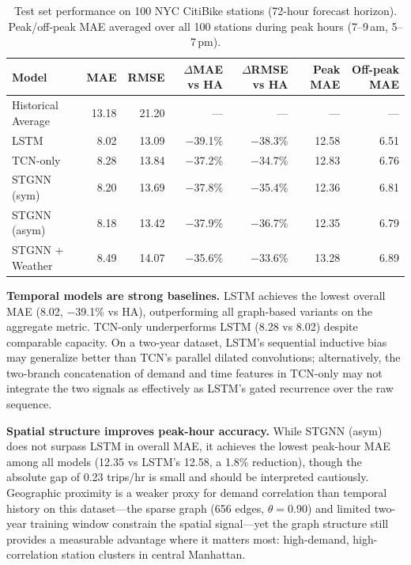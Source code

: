 \documentclass[12pt]{article}
\begin{document}
\begin{table}[h]
\centering
\small
\caption{Test set performance on 100 NYC CitiBike stations (72-hour forecast horizon).
Peak/off-peak MAE averaged over all 100 stations during peak hours (7--9\,am, 5--7\,pm).}
\label{tab:results}
\begin{tabular}{lrrrrrr}
\toprule
Model            & MAE   & RMSE  & $\Delta$MAE vs HA & $\Delta$RMSE vs HA & Peak MAE & Off-peak MAE \\
\midrule
Historical Average  & 13.18 & 21.20 & ---        & ---        & ---   & ---  \\
LSTM                &  8.02 & 13.09 & $-$39.1\%  & $-$38.3\%  & 12.58 & 6.51 \\
TCN-only            &  8.28 & 13.84 & $-$37.2\%  & $-$34.7\%  & 12.83 & 6.76 \\
STGNN (sym)         &  8.20 & 13.69 & $-$37.8\%  & $-$35.4\%  & 12.36 & 6.81 \\
STGNN (asym)        &  8.18 & 13.42 & $-$37.9\%  & $-$36.7\%  & 12.35 & 6.79 \\
STGNN + Weather     &  8.49 & 14.07 & $-$35.6\%  & $-$33.6\%  & 13.28 & 6.89 \\
\bottomrule
\end{tabular}
\end{table}

\textbf{Temporal models are strong baselines.}
LSTM achieves the lowest overall MAE (8.02, $-$39.1\% vs HA), outperforming all
graph-based variants on the aggregate metric.
TCN-only underperforms LSTM (8.28 vs 8.02) despite comparable capacity.
On a two-year dataset, LSTM's sequential inductive bias may generalize better
than TCN's parallel dilated convolutions; alternatively, the two-branch
concatenation of demand and time features in TCN-only may not integrate the
two signals as effectively as LSTM's gated recurrence over the raw sequence.

\textbf{Spatial structure improves peak-hour accuracy.}
While STGNN (asym) does not surpass LSTM in overall MAE, it achieves the lowest
peak-hour MAE among all models (12.35 vs LSTM's 12.58, a 1.8\% reduction),
though the absolute gap of 0.23 trips/hr is small and should be interpreted cautiously.
Geographic proximity is a weaker proxy for demand correlation than temporal history
on this dataset---the sparse graph (656 edges, $\theta = 0.90$) and limited two-year
training window constrain the spatial signal---yet the graph structure still provides
a measurable advantage where it matters most: high-demand, high-correlation station
clusters in central Manhattan.
\end{document}
